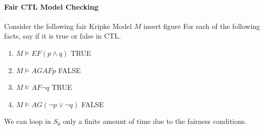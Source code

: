 \documentclass[11pt]{article}
\begin{document}
\paragraph{Fair CTL Model Checking} %
\label{par:ctl_model_checking}
Consider the following fair Kripke Model $M$
insert figure
For each of the following facts, say if it is true or false in CTL.
\begin{enumerate}
	\item $M \models EF (p \land q)$ TRUE
	\item $M \models AGAFp$ FALSE
	\item $M \models AF \lnot q$ TRUE
	\item $M \models AG (\lnot p \lor \lnot q)$ FALSE
\end{enumerate}
We can loop in $S_0$ only a finite amount of time due to the fairness conditions.

\end{document}
